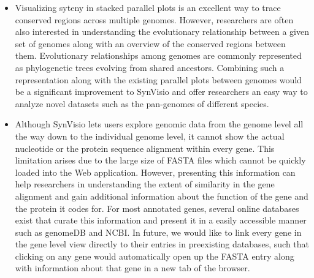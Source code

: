 \begin{itemize}
    \item Visualizing syteny in stacked parallel plots is an excellent way to trace conserved regions across multiple genomes. However, researchers are often also interested in understanding the evolutionary relationship between a given set of genomes along with an overview of the conserved regions between them. Evolutionary relationships among genomes are commonly represented as phylogenetic trees evolving from shared ancestors. Combining such a representation along with the existing parallel plots between genomes would be a significant improvement to SynVisio and offer researchers an easy way to analyze novel datasets such as the pan-genomes of different species.
    
    \item Although SynVisio lets users explore genomic data from the genome level all the way down to the individual genome level, it cannot show the actual nucleotide or the protein sequence alignment within every gene. This limitation arises due to the large size of FASTA files which cannot be quickly loaded into the Web application. However, presenting this information can help researchers in understanding the extent of similarity in the gene alignment and gain additional information about the function of the gene and the protein it codes for. For most annotated genes, several online databases exist that curate this information and present it in a easily accessible manner such as genomeDB and NCBI. In future, we would like to link every gene in the gene level view directly to their entries in preexisting databases, such that clicking on any gene would automatically open up the FASTA entry along with information about that gene in a new tab of the browser.    


\end{itemize}
 
